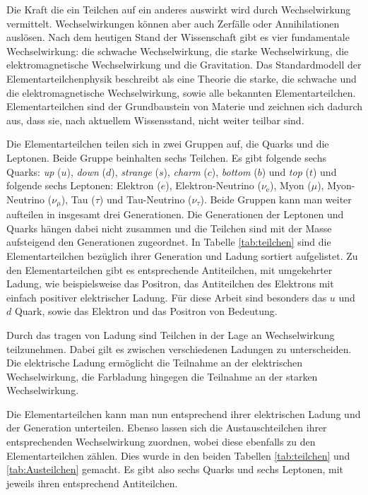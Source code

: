Die Kraft die ein Teilchen auf ein anderes auswirkt wird durch Wechselwirkung vermittelt. Wechselwirkungen k\"onnen aber auch Zerf\"alle oder Annihilationen ausl\"osen. Nach dem heutigen Stand der Wissenschaft gibt es vier fundamentale Wechselwirkung: die schwache Wechselwirkung, die starke Wechselwirkung, die elektromagnetische Wechselwirkung und die Gravitation. Das Standardmodell der Elementarteilchenphysik beschreibt als eine Theorie die starke, die schwache und die elektromagnetische Wechselwirkung, sowie alle bekannten Elementarteilchen.
Elementarteilchen sind der Grundbaustein von Materie und zeichnen sich dadurch aus, dass sie, nach aktuellem Wissensstand, nicht weiter teilbar sind.

Die Elementarteilchen teilen sich in zwei Gruppen auf, die Quarks und die Leptonen. Beide Gruppe beinhalten sechs Teilchen. Es gibt folgende sechs Quarks: \textit{up} ($u$), \textit{down} ($d$), \textit{strange} ($s$), \textit{charm} ($c$), \textit{bottom} ($b$) und \textit{top} ($t$) und folgende sechs Leptonen: Elektron ($e$), Elektron-Neutrino ($\nu_\text{e}$), Myon ($\mu$), Myon-Neutrino ($\nu_{\mu}$), Tau ($\tau$) und Tau-Neutrino ($\nu_{\tau}$). Beide Gruppen kann man weiter aufteilen in insgesamt drei Generationen. Die Generationen der Leptonen und Quarks h\"angen dabei nicht zusammen und die Teilchen sind mit der Masse aufsteigend den Generationen zugeordnet. In Tabelle \ref{tab:teilchen} sind die Elementarteilchen bez\"uglich ihrer Generation und Ladung sortiert aufgelistet. Zu den Elementarteilchen gibt es entsprechende Antiteilchen, mit umgekehrter Ladung, wie beispielsweise das Positron, das Antiteilchen des Elektrons mit einfach positiver elektrischer Ladung.
F\"ur diese Arbeit sind besonders das $u$ und $d$ Quark, sowie das Elektron und das Positron von Bedeutung.

Durch das tragen von Ladung sind Teilchen in der Lage an Wechselwirkung teilzunehmen. Dabei gilt es zwischen verschiedenen Ladungen zu unterscheiden. Die elektrische Ladung erm\"oglicht die Teilnahme an der elektrischen Wechselwirkung, die Farbladung hingegen die Teilnahme an der starken Wechselwirkung.

Die Elementarteilchen kann man nun entsprechend ihrer elektrischen Ladung und der Generation unterteilen. Ebenso lassen sich die Austauschteilchen ihrer entsprechenden Wechselwirkung zuordnen, wobei diese ebenfalls zu den Elementarteilchen z{\"a}hlen. Dies wurde in den beiden Tabellen \ref{tab:teilchen} und \ref{tab:Austeilchen} gemacht. Es gibt also sechs Quarks und sechs Leptonen, mit jeweils ihren entsprechend Antiteilchen.

